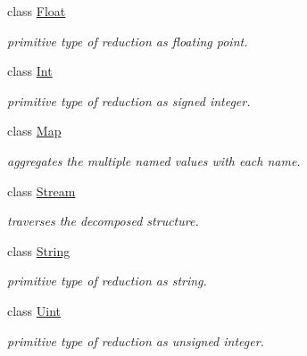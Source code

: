 \begin{DoxyCompactItemize}
class \hyperlink{classhryky_1_1reduction_1_1_float}{Float}
\begin{DoxyCompactList}\small\item\em primitive type of reduction as floating point. \end{DoxyCompactList}\item 
class \hyperlink{classhryky_1_1reduction_1_1_int}{Int}
\begin{DoxyCompactList}\small\item\em primitive type of reduction as signed integer. \end{DoxyCompactList}\item 
class \hyperlink{classhryky_1_1reduction_1_1_map}{Map}
\begin{DoxyCompactList}\small\item\em aggregates the multiple named values with each name. \end{DoxyCompactList}\item 
class \hyperlink{classhryky_1_1reduction_1_1_stream}{Stream}
\begin{DoxyCompactList}\small\item\em traverses the decomposed structure. \end{DoxyCompactList}\item 
class \hyperlink{classhryky_1_1reduction_1_1_string}{String}
\begin{DoxyCompactList}\small\item\em primitive type of reduction as string. \end{DoxyCompactList}\item 
class \hyperlink{classhryky_1_1reduction_1_1_uint}{Uint}
\begin{DoxyCompactList}\small\item\em primitive type of reduction as unsigned integer. \end{DoxyCompactList}\end{DoxyCompactItemize}

